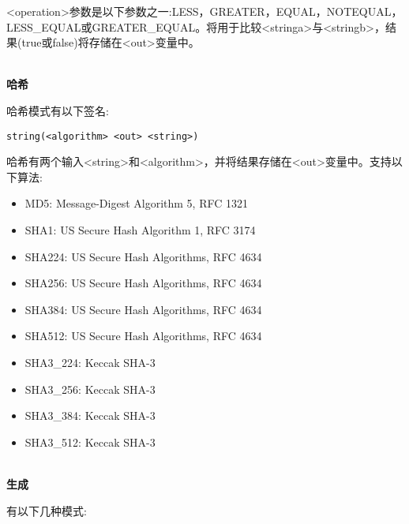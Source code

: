 <operation>参数是以下参数之一:LESS，GREATER，EQUAL，NOTEQUAL，LESS\_EQUAL或GREATER\_EQUAL。将用于比较<stringa>与<stringb>，结果(true或false)将存储在<out>变量中。

\hspace*{\fill} \\ %
\noindent
\textbf{哈希}

哈希模式有以下签名:

\begin{lstlisting}[style=styleCMake]
string(<algorithm> <out> <string>)
\end{lstlisting}

哈希有两个输入<string>和<algorithm>，并将结果存储在<out>变量中。支持以下算法:

\begin{itemize}
\item 
MD5: Message-Digest Algorithm 5, RFC 1321

\item 
SHA1: US Secure Hash Algorithm 1, RFC 3174

\item 
SHA224: US Secure Hash Algorithms, RFC 4634

\item 
SHA256: US Secure Hash Algorithms, RFC 4634

\item
SHA384: US Secure Hash Algorithms, RFC 4634

\item
SHA512: US Secure Hash Algorithms, RFC 4634

\item
SHA3\_224: Keccak SHA-3

\item
SHA3\_256: Keccak SHA-3

\item 
SHA3\_384: Keccak SHA-3

\item 
SHA3\_512: Keccak SHA-3
\end{itemize}

\hspace*{\fill} \\ %
\noindent
\textbf{生成}

有以下几种模式:

